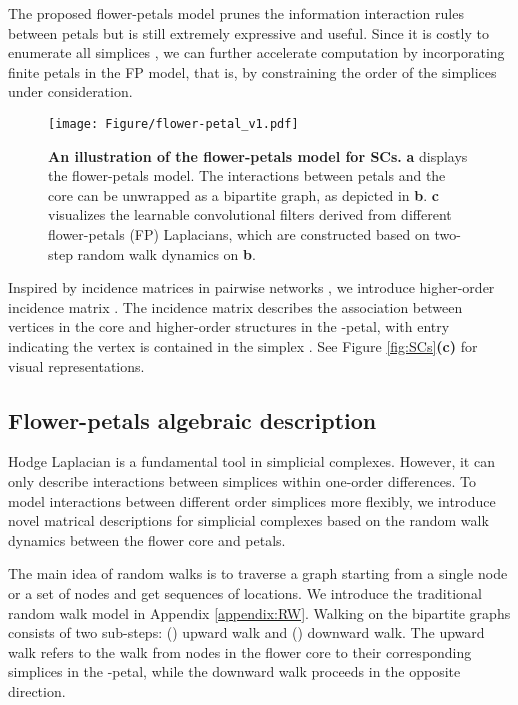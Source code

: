 \documentclass[letterpaper]{article} \usepackage{aaai24}
\theoremstyle{plain}
\theoremstyle{definition}
\theoremstyle{remark}
\begin{document}
The proposed flower-petals model prunes the information interaction rules between petals but is still extremely expressive and useful. 
Since it is costly to enumerate all simplices \cite{maxClique1999}, we can further accelerate computation by incorporating finite petals in the FP model, that is, by constraining the order of the simplices under consideration.

\begin{figure*}[!t]
\centering
\texttt{[image: Figure/flower-petal\_v1.pdf]}
\caption{\textbf{An illustration of the flower-petals model for SCs.} \textbf{a} displays the flower-petals model. The interactions between petals and the core can be unwrapped as a bipartite graph, as depicted in  \textbf{b}.
\textbf{c} visualizes the learnable convolutional filters  derived from different  flower-petals (FP) Laplacians, which are constructed based on two-step random walk dynamics on \textbf{b}.}
\label{fig:fp_model}
\end{figure*}




Inspired by incidence matrices in pairwise networks \cite{Hmatric}, we introduce higher-order incidence matrix . 
The incidence matrix describes the association between vertices in the core and higher-order structures in the -petal, with entry  indicating the vertex  is contained in the simplex . See Figure \ref{fig:SCs}\textbf{(c)} for visual representations.









\subsection{Flower-petals algebraic description} 

Hodge Laplacian \cite{hodge_schaub2020random, Hodge_Hatcher} is a fundamental tool in simplicial complexes.
However, it can only describe interactions between simplices within one-order differences. 
To model interactions between different order simplices more flexibly, we introduce novel matrical descriptions for simplicial complexes based on the random walk dynamics between the flower core and petals.

The main idea of random walks is to traverse a graph starting from a single node or a set of nodes and get sequences of locations. 
We introduce the traditional random walk model in Appendix \ref{appendix:RW}.
Walking on the bipartite graphs  consists of two sub-steps: () upward walk and () downward walk.
The upward walk refers to the walk from nodes in the flower core to their corresponding simplices in the -petal, while the downward walk proceeds in the opposite direction.
\end{document}
